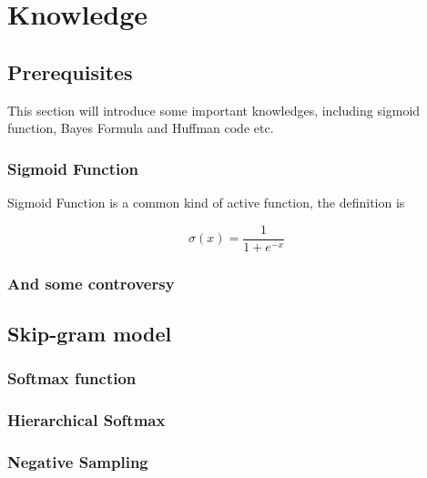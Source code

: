 \chapter{Knowledge}
\label{cha:knowledgei}

\section{Prerequisites}

This section will introduce some important knowledges, including sigmoid function, Bayes Formula and Huffman code etc.

\subsection{Sigmoid Function}

Sigmoid Function is a common kind of active function, the definition is

$$ \sigma(x) = \frac{1}{1+e^{-x}} $$ 

\subsection{And some controversy}




\section{Skip-gram model}


\subsection{Softmax function}


\subsection{Hierarchical Softmax}


\subsection{Negative Sampling}

